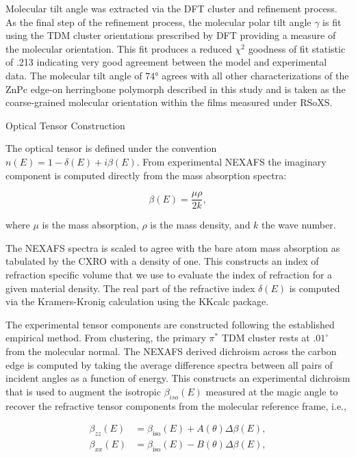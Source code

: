 Molecular tilt angle was extracted via the DFT cluster and refinement process. As the final step of the refinement process, the molecular polar tilt angle \(\gamma\) is fit using the TDM cluster orientations prescribed by DFT providing a measure of the molecular orientation. This fit produces a reduced \(\chi^{2}\) goodness of fit statistic of .213 indicating very good agreement between the model and experimental data. The molecular tilt angle of \(\ang{74}\) agrees with all other characterizations of the ZnPc edge-on herringbone polymorph described in this study and is taken as the coarse-grained molecular orientation within the films measured under RSoXS.

Optical Tensor Construction

The optical tensor is defined under the convention \(n(E) = 1 - \delta(E) + i\beta(E)\). From experimental NEXAFS the imaginary component is computed directly from the mass absorption spectra:

\begin{equation}
  \beta(E) = \frac{\mu\rho}{2k},
  \label{eq:S-beta}
\end{equation}

where \(\mu\) is the mass absorption, \(\rho\) is the mass density, and \(k\) the wave number.

The NEXAFS spectra is scaled to agree with the bare atom mass absorption as tabulated by the CXRO with a density of one.\autocite{CXROXRayInteractions} This constructs an index of refraction specific volume that we use to evaluate the index of refraction for a given material density. The real part of the refractive index \(\delta(E)\) is computed via the Kramers-Kronig calculation using the KKcalc package.\autocite{wattsCalculationKramersKronigTransform2014}

The experimental tensor components are constructed following the established empirical method.\autocite{ferronCompositionDictatesMolecular2023,collinsPolarizedXrayScattering2012} From clustering, the primary \(\pi^{*}\) TDM cluster rests at \({.01}^{\circ}\) from the molecular normal. The NEXAFS derived dichroism across the carbon edge is computed by taking the average difference spectra between all pairs of incident angles as a function of energy. This constructs an experimental dichroism that is used to augment the isotropic \(\beta_{iso}(E)\) measured at the magic angle to recover the refractive tensor components from the molecular reference frame, i.e.,

\begin{align}
  \beta_{zz}(E) &= \beta_{\mathrm{iso}}(E) + A(\theta)\Delta\beta(E), \label{eq:S-beta-zz}\\
  \beta_{xx}(E) &= \beta_{\mathrm{iso}}(E) - B(\theta)\Delta\beta(E), \label{eq:S-beta-xx}
\end{align}

